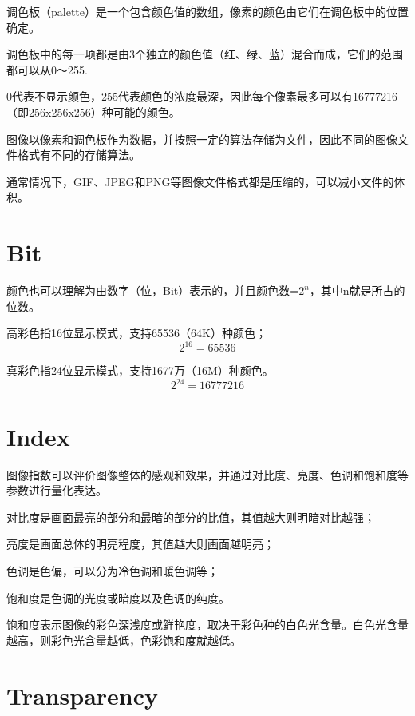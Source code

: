 调色板（palette）是一个包含颜色值的数组，像素的颜色由它们在调色板中的位置确定。

调色板中的每一项都是由3个独立的颜色值（红、绿、蓝）混合而成，它们的范围都可以从0～255.

0代表不显示颜色，255代表颜色的浓度最深，因此每个像素最多可以有16777216（即256x256x256）种可能的颜色。

图像以像素和调色板作为数据，并按照一定的算法存储为文件，因此不同的图像文件格式有不同的存储算法。

通常情况下，GIF、JPEG和PNG等图像文件格式都是压缩的，可以减小文件的体积。

\section{Bit}

颜色也可以理解为由数字（位，Bit）表示的，并且颜色数=$2^n$，其中n就是所占的位数。

\begin{compactitem}
\item 高彩色指16位显示模式，支持65536（64K）种颜色；
\[2^{16}=65536\]
\item 真彩色指24位显示模式，支持1677万（16M）种颜色。
\[2^{24}=16777216\]
\end{compactitem}

\section{Index}


图像指数可以评价图像整体的感观和效果，并通过对比度、亮度、色调和饱和度等参数进行量化表达。

\begin{compactitem}
\item 对比度是画面最亮的部分和最暗的部分的比值，其值越大则明暗对比越强；
\item 亮度是画面总体的明亮程度，其值越大则画面越明亮；
\item 色调是色偏，可以分为冷色调和暖色调等；
\item 饱和度是色调的光度或暗度以及色调的纯度。
\end{compactitem}

饱和度表示图像的彩色深浅度或鲜艳度，取决于彩色种的白色光含量。白色光含量越高，则彩色光含量越低，色彩饱和度就越低。


\section{Transparency}

